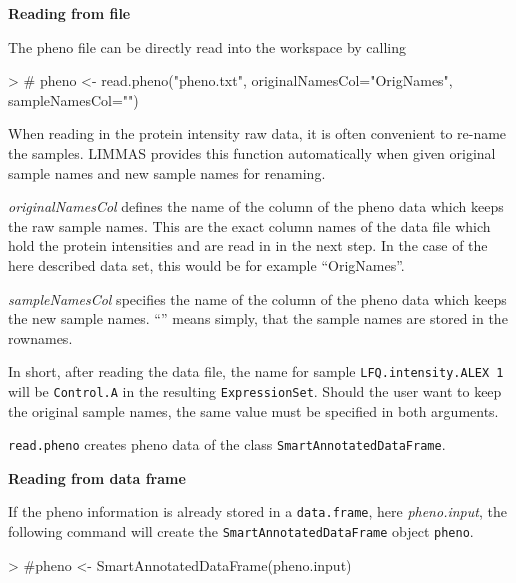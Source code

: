 \documentclass[a4paper,11pt]{article}
\newcommand{\Robject}[1]{{\texttt{#1}}}
\newcommand{\Rfunction}[1]{{\texttt{#1}}}
\begin{document}
\textbf{Reading from file}

The pheno file can be directly read into the workspace by calling

\begin{Schunk}
\begin{Sinput}
> # pheno <- read.pheno("pheno.txt", originalNamesCol="OrigNames", sampleNamesCol="")
\end{Sinput}
\end{Schunk}

When reading in the protein intensity raw data, it is often convenient to re-name the samples. LIMMAS provides this function automatically when given original sample names and new sample names for renaming.

\emph{originalNamesCol} defines the name of the column 
of the pheno data which keeps the raw sample names. This are the exact column names of the data file which hold the protein intensities and are read in in the next step. In the case of the here described data set, this would be for example ``OrigNames''. 

\emph{sampleNamesCol} specifies the name of the column of the pheno data
which keeps the new sample names. ``'' means simply, that the sample names are stored in the 
rownames.

In short, after reading the data file, the name for sample \texttt{LFQ.intensity.ALEX 1} will be \texttt{Control.A} in the resulting \Robject{ExpressionSet}. Should the user want to keep the original sample names, the same value must be specified in both arguments.

\Rfunction{read.pheno} creates pheno data of the class \Robject{SmartAnnotatedDataFrame}.

\textbf{Reading from data frame}

If the pheno information is already stored in a \Robject{data.frame}, here \emph{pheno.input}, the following command will create the \Robject{SmartAnnotatedDataFrame} object \Robject{pheno}.

\begin{Schunk}
\begin{Sinput}
> #pheno <- SmartAnnotatedDataFrame(pheno.input)
\end{Sinput}
\end{Schunk}
\end{document}
